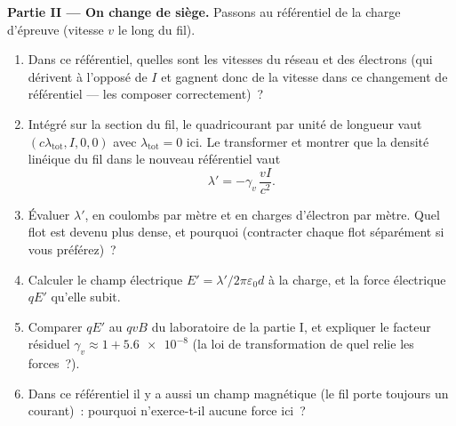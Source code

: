\begin{problem}
\medskip\noindent\textbf{Partie II --- On change de siège.}
Passons au référentiel de la charge d'épreuve (vitesse $v$ le long du fil).
\begin{enumerate}[resume]
  \item Dans ce référentiel, quelles sont les vitesses du réseau et des
        électrons (qui dérivent à l'opposé de $I$ et gagnent donc de la
        vitesse dans ce changement de référentiel --- les composer
        correctement)~?
  \item Intégré sur la section du fil, le quadricourant par unité de
        longueur vaut $(c\lambda_{\text{tot}}, I, 0, 0)$ avec
        $\lambda_{\text{tot}} = 0$ ici. Le transformer et montrer que
        la densité linéique du fil dans le nouveau référentiel vaut
        \[
        \lambda' = -\gamma_v\,\frac{vI}{c^2} .
        \]
  \item Évaluer $\lambda'$, en coulombs par mètre et en charges
        d'électron par mètre. Quel flot est devenu plus dense, et
        pourquoi (contracter chaque flot séparément si vous préférez)~?
  \item Calculer le champ électrique $E' = \lambda'/2\pi\varepsilon_0d$
        à la charge, et la force électrique $qE'$ qu'elle subit.
  \item Comparer $qE'$ au $qvB$ du laboratoire de la partie I, et
        expliquer le facteur résiduel $\gamma_v \approx 1 + \num{5.6e-8}$
        (la loi de transformation de quel  relie les
        forces~?).
  \item Dans ce référentiel il y a aussi un champ magnétique (le fil
        porte toujours un courant)~: pourquoi n'exerce-t-il aucune
        force ici~?
\end{enumerate}


\end{problem}
